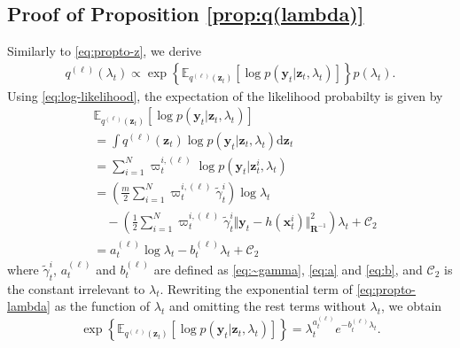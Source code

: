 \documentclass[10pt,twocolumn,twoside]{IEEEtran}
\newcommand{\e}[1]{\exp\left\{#1\right\}}
\newcommand{\E}[2][]{ \mathbb{E}_{#1}\left[#2\right] } %
\newcommand{\fs}{\text{.}} %
\newcommand{\x}{{ \bm{x} }}
\newcommand{\y}{{ \bm{y} }}
\newcommand{\z}{{ \bm{z} }}
\begin{document}
\begin{appendices}
\section{Proof of Proposition \ref{prop:q(lambda)}} \label{app:proof-q(lambda)}
Similarly to \eqref{eq:propto-z}, we derive
\begin{equation} \label{eq:propto-lambda}
\begin{split}
    q^{(\ell)}(\lambda_t) \propto \e{\E[q^{(\ell)}(\z_t)]{\log{p(\y_t|\z_t,\lambda_t)}}}p(\lambda_t) \fs
\end{split}
\end{equation}
Using \eqref{eq:log-likelihood}, the expectation of the likelihood probabilty is given by
\begin{equation*}
\begin{split}
    &\E[q^{(\ell)}(\z_t)]{\log{p(\y_t|\z_t,\lambda_t)}} \\
    &= \int{q^{(\ell)}(\z_t)\log{p(\y_t|\z_t,\lambda_t)}}\mathrm{d}\z_t \\
    &= \sum_{i=1}^N\varpi_t^{i,(\ell)}\log{p(\y_t|\z_t^i,\lambda_t)}\\
    &= \left(\frac{m}{2}\sum_{i=1}^N\varpi_t^{i,(\ell)}\tilde\gamma_t^i\right)\log\lambda_t \\
    &\quad- \left(\frac{1}{2}\sum_{i=1}^N\varpi_t^{i,(\ell)}\tilde\gamma_t^i\Vert\y_t-h(\x_t^i)\Vert^2_{\bm{R}^{-1}}\right)\lambda_t + \mathcal{C}_2 \\
    &= a_t^{(\ell)}\log\lambda_t - b_t^{(\ell)}\lambda_t + \mathcal{C}_2
\end{split}
\end{equation*}
where $\tilde\gamma_t^i$, $a_t^{(\ell)}$ and $b_t^{(\ell)}$ are defined as \eqref{eq:~gamma}, \eqref{eq:a} and \eqref{eq:b}, and $\mathcal{C}_2$ is the constant irrelevant to $\lambda_t$.
Rewriting the exponential term of \eqref{eq:propto-lambda} as the function of $\lambda_t$ and omitting the rest terms without $\lambda_t$, we obtain
\begin{equation} \label{eq:exp-lambda}
    \e{\E[q^{(\ell)}(\z_t)]{\log{p(\y_t|\z_t,\lambda_t)}}} = \lambda_t^{a_t^{(\ell)}}e^{-b_t^{(\ell)}\lambda_t} \fs    
\end{equation}


\end{appendices}
\end{document}
